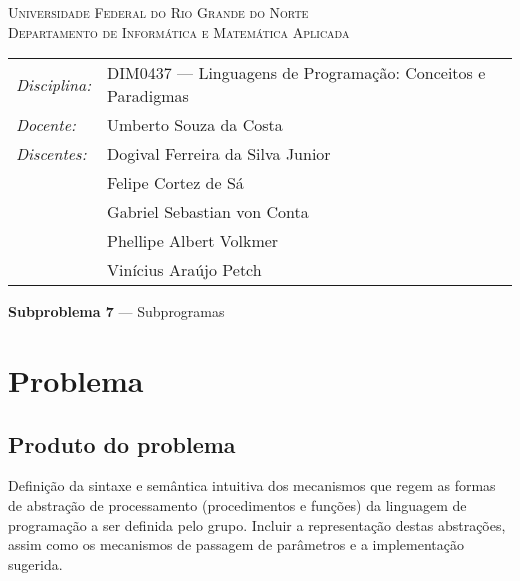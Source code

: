 \documentclass[12pt, a4paper]{article}
\begin{document}
    \begin{center}
        \textsc{Universidade Federal do Rio Grande do Norte} \\
        \textsc{Departamento de Informática e Matemática Aplicada}
    \end{center}

    \bigskip

    \begin{tabular}{@{}ll@{}}
            \emph{Disciplina:} & DIM0437 --- Linguagens de Programação:
                                 Conceitos e Paradigmas \\
            \emph{Docente:}    & Umberto Souza da Costa \\
            \emph{Discentes:}  & Dogival Ferreira da Silva Junior \\
                               & Felipe Cortez de Sá \\
                               & Gabriel Sebastian von Conta \\
                               & Phellipe Albert Volkmer \\
                               & Vinícius Araújo Petch
    \end{tabular}

    \bigskip

    \begin{center}
        \large \textbf{Subproblema 7} --- Subprogramas
    \end{center}

    \section{Problema}
        \subsection{Produto do problema}
        Definição da sintaxe e semântica intuitiva dos mecanismos que regem as
        formas de abstração de processamento (procedimentos e funções) da
        linguagem de programação a ser definida pelo grupo. Incluir a
        representação destas abstrações, assim como os mecanismos de passagem
        de parâmetros e a implementação sugerida.
\end{document}
